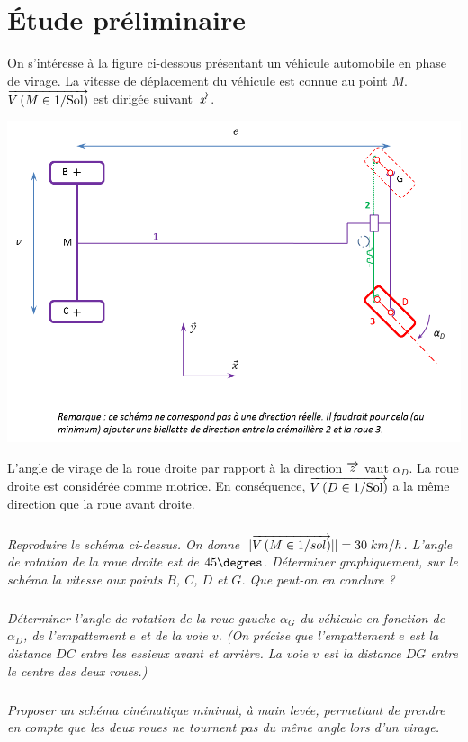\documentclass[10pt]{article}
\newif\ifxp
\begin{document}
\ifxp

\else

\fi


\section{Étude préliminaire}

On s'intéresse à la figure ci-dessous présentant un véhicule automobile en phase de virage. La vitesse de déplacement du véhicule est connue au point $M$. $\overrightarrow{V\left( {M} \in {1}/{\text{Sol}}\right)}$ est dirigée suivant $\overrightarrow{x}$.


\begin{center}
\includegraphics[width=.9\textwidth]{images/voiture}
\end{center}

L'angle de virage de la roue droite par rapport à la direction $\overrightarrow{z}$ vaut $\alpha_D$. La roue droite est considérée comme motrice. En conséquence, $\overrightarrow{V\left( {D} \in {1}/{\text{Sol}}\right)}$ a la même direction que la roue avant droite. 

\subparagraph{}
\textit{Reproduire le schéma ci-dessus. On donne $||\overrightarrow{V\left( {M} \in {1}/{sol}\right)}||=30\; km/h$. L'angle de rotation de la roue droite est de $45\degres$. Déterminer graphiquement, sur le schéma la vitesse aux points $B$, $C$, $D$ et $G$. Que peut-on en conclure ?}

\subparagraph{}
\textit{Déterminer l'angle de rotation de la roue gauche $\alpha_G$ du véhicule en fonction de $\alpha_D$, de l'empattement $e$ et de la voie $v$. (On précise que l'empattement $e$ est la distance $DC$ entre les essieux avant et arrière. La voie $v$ est la distance $DG$ entre le centre des deux roues.)}



\subparagraph{}
\textit{Proposer un schéma cinématique minimal, à main levée, permettant de prendre en compte que les deux roues ne tournent pas du même angle lors d'un virage. }
\end{document}
